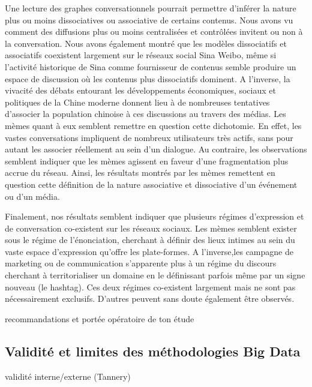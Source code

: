 Une lecture des graphes conversationnels pourrait permettre d'inférer la nature plus ou moins dissociatives ou associative de certains contenus. Nous avons vu comment des diffusions plus ou moins centralisées et contrôlées invitent ou non à la conversation. Nous avons également montré que les modèles dissociatifs et associatifs coexistent largement sur le réseaux social Sina Weibo, même si l'activité historique de Sina comme fournisseur de contenus semble produire un espace de discussion où les contenus plus dissociatifs dominent. A l{\textquoteright}inverse, la vivacité des débats entourant les développements économiques, sociaux et politiques de la Chine moderne donnent lieu à de nombreuses tentatives d{\textquoteright}associer la population chinoise à ces discussions au travers des médias. Les mèmes quant à eux semblent remettre en question cette dichotomie. En effet, les vastes conversations impliquent de nombreux utilisateurs très actifs, sans pour autant les associer réellement au sein d'un dialogue. Au contraire, les observations semblent indiquer que les mèmes agissent en faveur d'une fragmentation plus accrue du réseau. Ainsi, les résultats montrés par les mèmes remettent en question cette définition de la nature associative et dissociative d'un événement ou d'un média. 

\bigskip
Finalement, nos résultats semblent indiquer que plusieurs régimes d'expression et de conversation co-existent sur les réseaux sociaux. Les mèmes semblent exister sous le régime de l'énonciation, cherchant à définir des lieux intimes au sein du vaste espace d'expression qu'offre les plate-formes. A l'inverse,les campagne de marketing ou de communication s'apparente plus à un régime du discours cherchant à territorialiser un domaine en le définissant parfois même par un signe nouveau (le hashtag). Ces deux régimes co-existent largement mais ne sont pas nécessairement exclusifs. D'autres peuvent sans doute également être observés.


recommandations et portée opératoire de ton étude


\subsection[Validité et limites des méthodologies Big Data]{Validité et limites des méthodologies Big Data}


validité interne/externe (Tannery)


